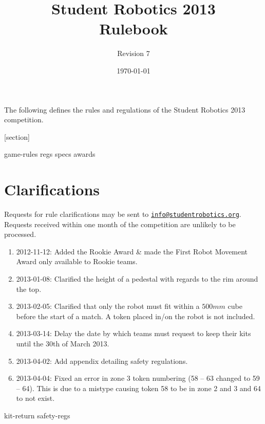 \documentclass[a4paper, 11pt]{scrartcl}
\title {Student Robotics 2013\\ Rulebook}
\author{Revision 7}
\date{\today}
\begin{document}
\maketitle

\noindent The following defines the rules and regulations of the Student Robotics 2013 competition.

[section]
\newcommand{\rcn}{\stepcounter{rule}\arabic{section}.\arabic{rule}}
\renewcommand{\labelenumi}{\rcn}

 {game-rules}
\newpage
 {regs}
\newpage
 {specs}
\newpage
 {awards}

\renewcommand{\labelenumi}{\rcn}

\section{Clarifications}
Requests for rule clarifications may be sent to \href{mailto:info@studentrobotics.org}{\nolinkurl{info@studentrobotics.org}}.
Requests received within one month of the competition are unlikely to be processed.


\begin{enumerate}
\item 2012-11-12: Added the Rookie Award \& made the First Robot Movement Award only available to Rookie teams.
\item 2013-01-08: Clarified the height of a pedestal with regards to the rim around the top.
\item 2013-02-05: Clarified that only the robot must fit within a $500mm$ cube before the start of a match. A token placed in/on the robot is not included.
\item 2013-03-14: Delay the date by which teams must request to keep their kits until the 30th of March 2013.
\item 2013-04-02: Add appendix detailing safety regulations.
\item 2013-04-04: Fixed an error in zone 3 token numbering (58 -- 63 changed to 59 -- 64). This is due to a mistype causing token 58 to be in zone 2 and 3 and 64 to not exist. 
\end{enumerate}

\newpage
\appendix
\appendixpage
\addappheadtotoc
 {kit-return}
 {safety-regs}
\end{document}
